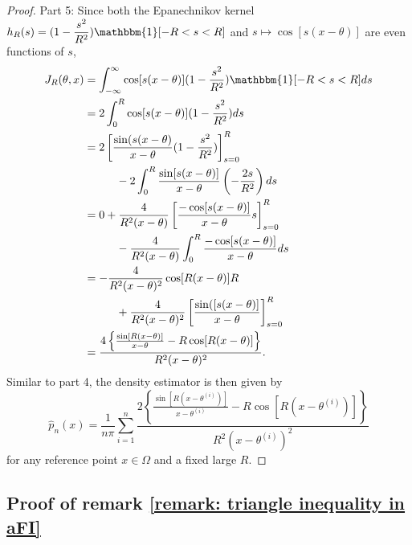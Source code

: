 \documentclass[%
 reprint,
 amsmath,amssymb,
 aps,
]{revtex4-2}
\begin{document}
\begin{proof}
    Part 5: Since both the Epanechnikov kernel $\displaystyle h_R(s) = (1 - \frac{s^2}{R^2}) \mathbbm{1}[-R < s < R]$ and $s \mapsto \cos[s(x - \theta)]$ are even functions of $s$,
    \begin{align*}
        J_R(\theta, x) & = \int_{-\infty}^\infty \cos[s(x - \theta)](1 - \frac{s^2}{R^2}) \mathbbm{1}[-R < s < R]ds \\
        & = 2 \int_0^R \cos[s(x - \theta)](1 - \frac{s^2}{R^2}) ds \\
        & = 2\left[\frac{\sin(s(x - \theta)}{x - \theta}(1 - \frac{s^2}{R^2}) \right]^R_{s = 0} \\
        & \hspace{1cm} -2\int_0^R \frac{\sin[s(x - \theta)]}{x - \theta}\left(-\frac{2s}{R^2} \right) ds \\
        & = 0 + \frac{4}{R^2(x - \theta)} \left[\frac{-\cos[s(x - \theta)]}{x - \theta}s \right]^R_{s = 0} \\
        & \hspace{1cm} - \frac{4}{R^2(x - \theta)} \int_0^R \frac{-\cos[s(x - \theta)]}{x - \theta} ds \\
        & = -\frac{4}{R^2(x - \theta)^2}\cos[R(x - \theta)]R \\
        & \hspace{1cm} + \frac{4}{R^2(x - \theta)^2}\left[\frac{\sin([s(x - \theta)]}{x - \theta} \right]^R_{s = 0} \\
        & = \frac{4\left\{\frac{\sin[R(x - \theta)]}{x - \theta} - R\cos[R(x - \theta)] \right\}}{R^2(x - \theta)^2}.
    \end{align*}
    Similar to part 4, the density estimator is then given by
    \begin{equation*}
        \hat{p}_n(x) = \frac{1}{n\pi} \sum_{i = 1}^n \frac{2\left\{\frac{\sin[R(x - \theta^{(i)})]}{x - \theta^{(i)}} - R\cos[R(x - \theta^{(i)})] \right\}}{R^2(x - \theta^{(i)})^2}
    \end{equation*}
    for any reference point $x \in \Omega$ and a fixed large $R$.
\end{proof}

\subsection{Proof of remark \ref{remark: triangle inequality in aFI}}
\end{document}
